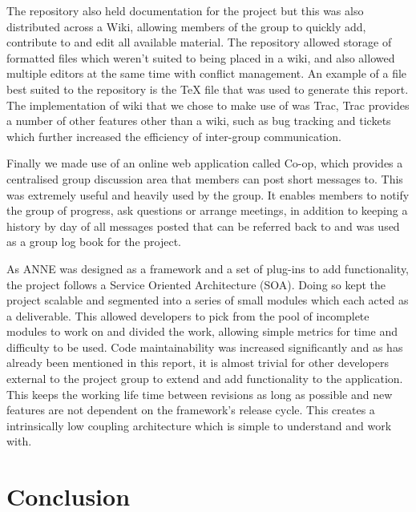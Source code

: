 \documentclass{acm_proc_article-sp}
\begin{document}
{The repository also held documentation for the project but this was also distributed across a Wiki, allowing members of the group to quickly add, contribute to and edit all available material. The repository allowed storage of formatted files which weren't suited to being placed in a wiki, and also allowed multiple editors at the same time with conflict management. An example of a file best suited to the repository is the TeX file that was used to generate this report. The implementation of wiki that we chose to make use of was Trac\cite{eval:trac}, Trac provides a number of other features other than a wiki, such as bug tracking and tickets which further increased the efficiency of inter-group communication.

Finally we made use of an online web application called Co-op\cite{eval:coop}, which provides a centralised group discussion area that members can post short messages to. This was extremely useful and heavily used by the group. It enables members to notify the group of progress, ask questions or arrange meetings, in addition to keeping a history by day of all messages posted that can be referred back to and was used as a group log book for the project.

As ANNE was designed as a framework and a set of plug-ins to add functionality, the project follows a Service Oriented Architecture (SOA). Doing so kept the project scalable and segmented into a series of small modules which each acted as a deliverable. This allowed developers to pick from the pool of incomplete modules to work on and divided the work, allowing simple metrics for time and difficulty to be used. Code maintainability was increased significantly and as has already been mentioned in this report, it is almost trivial for other developers external to the project group to extend and add functionality to the application. This keeps the working life time between revisions as long as possible and new features are not dependent on the framework's release cycle. This creates a intrinsically low coupling architecture which is simple to understand and work with.
}

\section{Conclusion}
\end{document}
